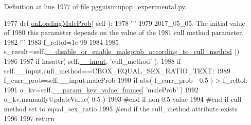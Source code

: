Definition at line 1977 of file pgguisimupop\+\_\+experimental.\+py.


\begin{DoxyCode}
1977     \textcolor{keyword}{def }\hyperlink{classnegui_1_1pgguisimupop__experimental_1_1PGGuiSimuPop_ab0c64eb88e6d24ff9f6e7e52813be21c}{onLoadingMaleProb}( self ):
1978         \textcolor{stringliteral}{'''}
1979 \textcolor{stringliteral}{        2017\_05\_05.  The initial value of}
1980 \textcolor{stringliteral}{        this parameter depends on the value of the}
1981 \textcolor{stringliteral}{        cull method parameter. }
1982 \textcolor{stringliteral}{        '''}
1983         f\_reltol=1e-99
1984         
1985         s\_result=self.\hyperlink{classnegui_1_1pgguisimupop__experimental_1_1PGGuiSimuPop_acbe690a5acc19473e1396f20ae39177b}{\_\_disable\_or\_enable\_maleprob\_according\_to\_cull\_method}
      ()
1986         
1987         \textcolor{keywordflow}{if} hasattr( self.\hyperlink{classnegui_1_1pgguisimupop__experimental_1_1PGGuiSimuPop_a3a86711306a221a40328ad4587999ad8}{\_\_input}, \textcolor{stringliteral}{'cull\_method'} ):
1988             \textcolor{keywordflow}{if} self.\_\_input.cull\_method==CBOX\_EQUAL\_SEX\_RATIO\_TEXT:
1989                 f\_curr\_prob=self.\_\_input.maleProb
1990                 \textcolor{keywordflow}{if} abs( f\_curr\_prob - 0.5 ) > f\_reltol:
1991                     o\_kv=self.\hyperlink{classnegui_1_1pgguisimupop__experimental_1_1PGGuiSimuPop_ad95dc47c19913b4eb1a4151af1e5879d}{\_\_param\_key\_value\_frames}[ \textcolor{stringliteral}{'maleProb'} ]
1992                     o\_kv.manuallyUpdateValue( 0.5 )
1993                 \textcolor{comment}{#end if non-0.5 value}
1994             \textcolor{comment}{#end if cull method set to equal\_sex\_ratio  }
1995         \textcolor{comment}{#end if the cull\_method attribute exists}
1996 
1997         \textcolor{keywordflow}{return}
\end{DoxyCode}
